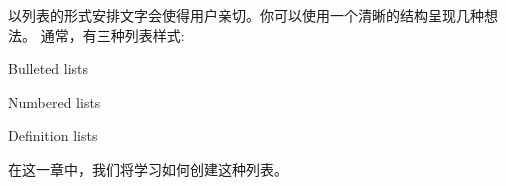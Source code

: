 以列表的形式安排文字会使得用户亲切。你可以使用一个清晰的结构呈现几种想法。
通常，有三种列表样式:
\begin{enumerater}
	\item{Bulleted lists}
	\item{Numbered lists}
	\item{Definition lists}
\end{enumerater}
在这一章中，我们将学习如何创建这种列表。
